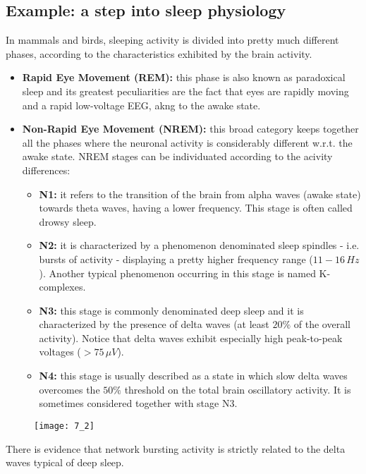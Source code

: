 \subsection{Example: a step into sleep physiology}
In mammals and birds, sleeping activity is divided into pretty much different
phases, according to the characteristics exhibited by the brain activity.
\begin{itemize}
    \item \textbf{Rapid Eye Movement (REM):} this phase is also known as paradoxical
          sleep and its greatest peculiarities are the fact that eyes are rapidly moving
          and a rapid low-voltage EEG, akng to the awake state.
    \item \textbf{Non-Rapid Eye Movement (NREM):} this broad category keeps together
          all the phases where the neuronal activity is considerably different w.r.t. the
          awake state. NREM stages can be individuated according to the acivity differences:
          \begin{itemize}
              \item \textbf{N1:} it refers to the transition of the brain from alpha waves
                    (awake state) towards theta waves, having a lower frequency. This stage is
                    often called drowsy sleep.
              \item \textbf{N2:} it is characterized by a phenomenon denominated sleep
                    spindles - i.e. bursts of activity - displaying a pretty higher frequency range
                    (\(11-16\,Hz\)). Another typical phenomenon occurring in this stage is named
                    K-complexes.
              \item \textbf{N3:} this stage is commonly denominated deep sleep and it is
                    characterized by the presence of delta waves (at least \(20\%\) of the
                    overall activity). Notice that delta waves exhibit especially high
                    peak-to-peak voltages (\(>75\,\mu{V}\)).
              \item \textbf{N4:} this stage is usually described as a state in which slow
                    delta waves overcomes the \(50\%\) threshold on the total brain oscillatory
                    activity. It is sometimes considered together with stage N3.
          \end{itemize}
\end{itemize}
\begin{figure}[H]
    \texttt{[image: 7\_2]}
    \centering
\end{figure}
There is evidence that network bursting activity is strictly related to the delta
waves typical of deep sleep.


